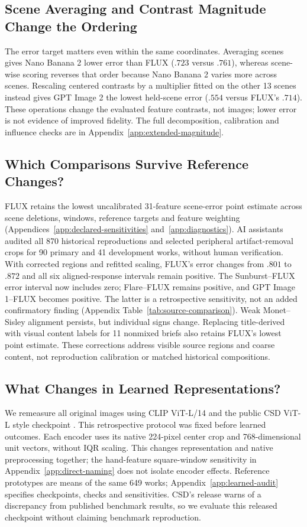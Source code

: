 \subsection{Scene Averaging and Contrast Magnitude Change the Ordering}
The error target matters even within the same coordinates.
Averaging scenes gives Nano Banana 2 lower error than FLUX ($.723$ versus $.761$),
whereas scene-wise scoring reverses that order because Nano Banana 2 varies more
across scenes. Rescaling centered contrasts by a multiplier fitted on the other
13 scenes instead gives GPT Image 2 the lowest held-scene error ($.554$ versus
FLUX's $.714$). These operations change the evaluated feature contrasts, not
images; lower error is not evidence of improved fidelity. The full decomposition,
calibration and influence checks are in Appendix~\ref{app:extended-magnitude}.

\subsection{Which Comparisons Survive Reference Changes?}\label{sec:source-correction}
FLUX retains the lowest uncalibrated 31-feature scene-error point estimate
across scene deletions, windows, reference targets and feature weighting
(Appendices~\ref{app:declared-sensitivities} and~\ref{app:diagnostics}).
AI assistants audited all 870 historical reproductions and selected peripheral
artifact-removal crops for 90 primary and 41 development works, without human
verification. With corrected regions and refitted scaling, FLUX's error changes
from $.801$ to $.872$ and all six aligned-response intervals remain positive.
The Sunburst--FLUX error interval now includes zero; Flare--FLUX remains
positive, and GPT Image 1--FLUX becomes positive. The latter is a retrospective
sensitivity, not an added confirmatory finding
(Appendix Table~\ref{tab:source-comparison}).
Weak Monet--Sisley alignment persists, but individual signs change.
Replacing title-derived with visual content labels for 11 nonmixed briefs
also retains FLUX's lowest point estimate. These corrections address visible
source regions and coarse content, not reproduction calibration or matched
historical compositions.

\subsection{What Changes in Learned Representations?}\label{sec:learned-results}
We remeasure all original images using CLIP ViT-L/14 \citep{radford2021}
and the public CSD ViT-L style checkpoint \citep{somepalli2024style}.
This retrospective protocol was fixed before learned outcomes. Each encoder
uses its native 224-pixel center crop and 768-dimensional unit vectors, without
IQR scaling. This changes representation and native preprocessing together;
the hand-feature square-window sensitivity in Appendix~\ref{app:direct-naming}
does not isolate encoder effects. Reference prototypes are means of the same 649 works;
Appendix~\ref{app:learned-audit} specifies checkpoints, checks and sensitivities.
CSD's release warns of a discrepancy from published benchmark results, so
we evaluate this released checkpoint without claiming benchmark reproduction.


